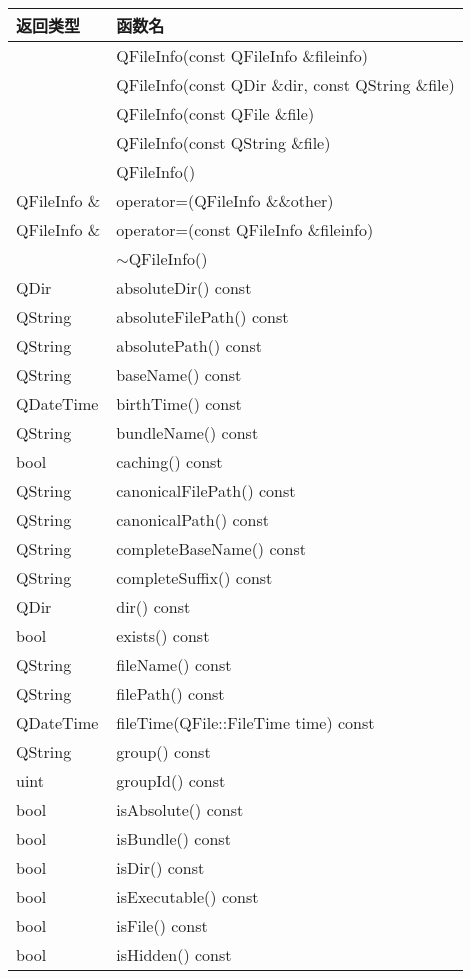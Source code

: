 \begin{longtable}{|l|l|}
\hline
返回类型& 	函数名\\
\hline
&	QFileInfo(const QFileInfo \&fileinfo)\\
\hline
&	QFileInfo(const QDir \&dir, const QString \&file)\\
\hline
&	QFileInfo(const QFile \&file)\\
\hline
&	QFileInfo(const QString \&file)\\
\hline
&	QFileInfo()\\
\hline
QFileInfo \& &	operator=(QFileInfo \&\&other)\\
\hline
QFileInfo \& &	operator=(const QFileInfo \&fileinfo)\\
\hline
&	$\sim$QFileInfo()\\
\hline
QDir& 	absoluteDir() const\\
\hline
QString& 	absoluteFilePath() const\\
\hline
QString& 	absolutePath() const\\
\hline
QString& 	baseName() const\\
\hline
QDateTime& 	birthTime() const\\
\hline
QString& 	bundleName() const\\
\hline
bool& 	caching() const\\
\hline
QString& 	canonicalFilePath() const\\
\hline
QString& 	canonicalPath() const\\
\hline
QString& 	completeBaseName() const\\
\hline
QString& 	completeSuffix() const\\
\hline
QDir& 	dir() const\\
\hline
bool& 	exists() const\\
\hline
QString& 	fileName() const\\
\hline
QString& 	filePath() const\\
\hline
QDateTime& 	fileTime(QFile::FileTime time) const\\
\hline
QString& 	group() const\\
\hline
uint& 	groupId() const\\
\hline
bool& 	isAbsolute() const\\
\hline
bool& 	isBundle() const\\
\hline
bool& 	isDir() const\\
\hline
bool& 	isExecutable() const\\
\hline
bool& 	isFile() const\\
\hline
bool& 	isHidden() const\\

\end{longtable}

